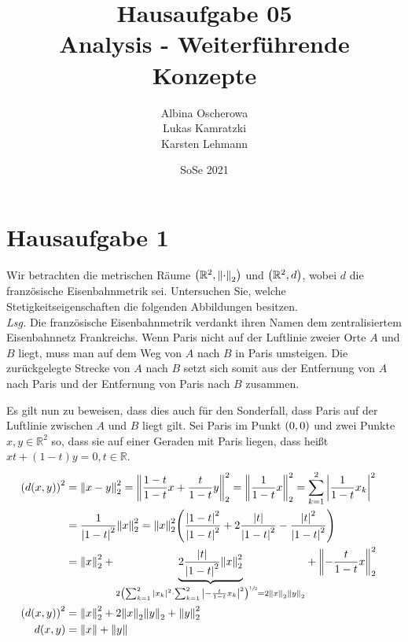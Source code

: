 \documentclass{scrreprt}
\author{Albina Oscherowa \\ Lukas Kamratzki \\ Karsten Lehmann}
\date{SoSe 2021}
\title{Hausaufgabe 05 \\Analysis - Weiterführende Konzepte}
\begin{document}
\section*{Hausaufgabe 1}

Wir betrachten die metrischen Räume $\qty(\mathbb{R}^2, \norm{\cdot}_2)$ und
$\qty(\mathbb{R}^2, d)$, wobei $d$ die französische Eisenbahnmetrik sei.
Untersuchen Sie, welche Stetigkeitseigenschaften die folgenden Abbildungen
besitzen. \\

\textit{Lsg.} Die französische Eisenbahnmetrik verdankt ihren Namen dem
zentralisiertem Eisenbahnnetz Frankreichs.
Wenn Paris nicht auf der Luftlinie zweier Orte $A$ und $B$ liegt, muss man
auf dem Weg von $A$ nach $B$ in Paris umsteigen.
Die zurückgelegte Strecke von $A$ nach $B$ setzt sich somit aus der Entfernung
von $A$ nach Paris und der Entfernung von Paris nach $B$ zusammen.

Es gilt nun zu beweisen, dass dies auch für den Sonderfall, dass Paris auf der
Luftlinie zwischen $A$ und $B$ liegt gilt.
Sei Paris im Punkt $\qty(0, 0)$ und zwei Punkte $x, y \in \mathbb{R}^2$ so,
dass sie auf einer Geraden mit Paris liegen, dass heißt
$xt + (1 - t)y = 0, t \in \mathbb{R}$.
\begin{align*}
  \qty(d(x, y))^2 &= \norm{x - y}_2^2 = \norm{\frac{1 - t}{1 - t} x + \frac{t}{1 - t} y}_2^2
                   = \norm{\frac{1}{1 - t} x}_2^2
                   = \sum_{k = 1}^2 \abs{\frac{1}{1 - t} x_k}^2 & \\
                  &= \frac{1}{\abs{1 - t}^2} \norm{x}_2^2
                   = \norm{x}_2^2 \qty(\frac{\abs{1 - t}^2}{\abs{1 - t}^2} + 2\frac{\abs{t}}{\abs{1 - t}^2} - \frac{\abs{t}^2}{\abs{1 - t}^2}) \\
                  &= \norm{x}_2^2 +
                   \underset{
                     2 \qty(\sum_{k = 1}^2 \abs{x_k}^2 \cdot \sum_{k = 1}^2 \abs{- \frac{t}{1 - t} x_k}^2)^{\sfrac{1}{2}} = 2 \norm{x}_2 \norm{y}_2
                   }{\underbrace{2\frac{\abs{t}}{\abs{1 - t}^2} \norm{x}_2^2}}
                   + \norm{-\frac{t}{1 - t} x}_2^2 \\
  \qty(d(x, y))^2 &= \norm{x}_2^2 + 2 \norm{x}_2 \norm{y}_2 + \norm{y}_2^2 \\
  d(x, y)         &= \norm{x} + \norm{y}
\end{align*}
\end{document}
